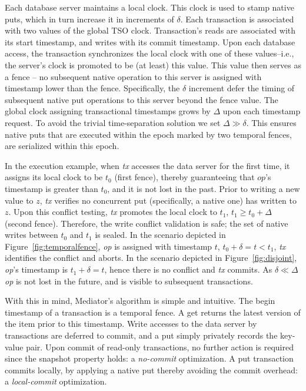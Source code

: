 Each database server maintains a local clock.  
This clock is used to stamp native puts, which in turn increase it in increments 
of $\delta$. Each transaction is associated with two values of the global TSO
clock.
Transaction's reads are associated with its
start timestamp, and writes with its commit
timestamp.
Upon each database access, the transaction synchronizes the local clock with
one of these values--i.e., the server's clock is promoted to be (at
least) this value. This value then serves as a fence -- no subsequent native
operation to this server is assigned with timestamp lower than the fence. Specifically,
the $\delta$ increment defer the timing of subsequent native put
operations to this server beyond the fence value. 
The global clock assigning transactional timestamps grows by $\Delta$ upon each 
timestamp request. 
To avoid the trivial time-separation solution we set $\Delta \gg \delta$. This
ensures native puts that are executed within the 
epoch marked by two temporal fences, are serialized within this epoch.

In the execution example, when {\em tx\/} accesses the data server 
for the first time, it assigns its local clock to be $t_0$ (first fence),
thereby guaranteeing that $op$'s timestamp is greater than $t_0$, and it is not
lost in the past.
Prior to writing a new value to $z$, {\em tx\/} verifies no
concurrent put (specifically, a native one) has written to $z$. %
Upon this conflict testing, {\em tx\/} promotes the local clock to $t_1$, $t_1
\geq t_0 + \Delta$ (second fence).
Therefore, the write conflict validation is safe; the set of native writes
between $t_0$ and $t_1$ is sealed. 
In the scenario depicted in Figure~\ref{fig:temporalfence}, 
\emph{op} is assigned with timestamp $t$, $t_0 + \delta = t < t_1$, 
{\em tx\/} identifies the conflict and aborts. In the scenario depicted in
Figure~\ref{fig:disjoint}, \emph{op}'s timestamp is $t_1 + \delta=t$, hence
there is no conflict and \emph{tx} commits.
As $\delta \ll \Delta$ \emph{op} is not lost in the future, and is visible to
subsequent transactions.

With this in mind, Mediator's algorithm is simple and intuitive.
The begin timestamp of a transaction
is
a temporal fence. A get returns the latest version of the item prior to this timestamp.
Write accesses to the data server by transactions are deferred to commit,
and a put simply privately records the key-value pair. Upon commit of read-only
transactions, no further action is required
since the snapshot property holds: a {\em no-commit\/} optimization. 
A put transaction commits locally, 
by applying a native put thereby avoiding the commit
overhead: a \emph{local-commit} optimization.

